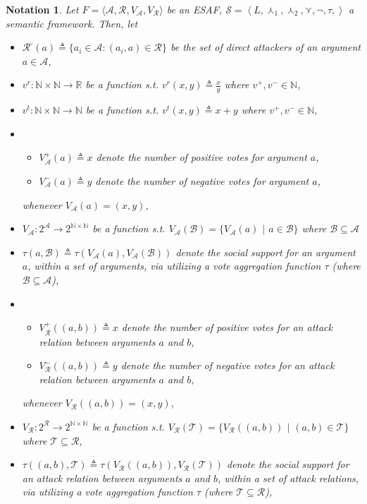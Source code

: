 \documentclass{article}
\newtheorem{notation}{Notation}
\newcommand{\nat}{\mathbb{N}}   %
\newcommand{\real}{\mathbb{R}}  %
\newcommand{\args}{\mathcal{A}} %
\newcommand{\att}{\mathcal{R}}  %
\newcommand{\valueset}{L}
\newcommand{\varg}{V_{\args}}   %
\newcommand{\vargpro}[1]{\varg^+\left(#1\right)} %
\newcommand{\vargcon}[1]{\varg^-\left(#1\right)} %
\newcommand{\vatt}{V_{\att}}   %
\newcommand{\vattpro}[1]{\vatt^+\left(#1\right)} %
\newcommand{\vattcon}[1]{\vatt^-\left(#1\right)} %
\newcommand{\attackers}[1]{\att^\text{-}\left(#1\right)}
\newcommand{\safid}{F}               %
\newcommand{\saf}{\safid = \safbody} %
\newcommand{\safbody}{\langle \args, \att, \varg, \vatt \rangle} %
\newcommand{\sembodyNew}{\left\langle \valueset,\SAFand_1, \SAFand_2,\SAFor,\lnot,\tau, \right\rangle} %
\newcommand{\SAFand}{\curlywedge}     %
\newcommand{\SAFor}{\curlyvee}        %
\newcommand{\sem}{\mathcal{S}}
\begin{document}
\begin{notation}
Let $\saf$ be an ESAF, $\sem = \sembodyNew$ a semantic framework. Then, let
\begin{itemize}
\item $\attackers{a} \triangleq \{a_i \in \args: (a_i, a) \in \att\}$ be the set of direct attackers of an argument $a \in \args$, 
\item $v^r: \nat \times \nat \to \real$ be a function s.t. $v^r(x, y) \triangleq \frac{x}{y}$ where $v^{+}, v^{-} \in \mathbb{N}$,
\item $v^t: \nat \times \nat \to \nat$ be a function s.t. $v^t(x, y) \triangleq x + y$ where $v^{+}, v^{-} \in \mathbb{N}$, 
\item 
\begin{itemize}
\item $\vargpro a \triangleq x$ denote the number of positive votes for argument $a$,
\item $\vargcon a \triangleq y$ denote the number of negative votes for argument $a$,
\end{itemize}
whenever $\varg (a) = (x, y)$,
\\
\item $\varg: 2^\args \to 2^{\nat \times \nat}$ be a function s.t. $\varg(\mathcal{B}) = \{\varg(a)$ $|$ $a \in \mathcal{B}\}$ where $\mathcal{B} \subseteq \args$
\item $\tau(a, \mathcal{B}) \triangleq \tau(V_{\mathcal{A}}(a), \varg(\mathcal{B}))$ denote the social support for an argument $a$, within a set of arguments, via utilizing a vote aggregation function $\tau$ (where $\mathcal{B} \subseteq \args$),
\item
\begin{itemize}
\item $\vattpro{(a, b)} \triangleq x$ denote the number of positive votes for an attack relation between arguments  $a$ and $b$,
\item  $ \vattcon{(a, b)} \triangleq y$ denote the number of negative votes for an attack relation between arguments  $a$ and $b$,
\end{itemize}
whenever $\vatt ((a, b)) = (x, y)$,
\\
\item $\vatt: 2^\att \to 2^{\nat \times \nat}$ be a function s.t. $\vatt(\mathcal{T}) = \{\vatt((a, b))$ $|$ $(a, b) \in \mathcal{T}\}$ where $\mathcal{T} \subseteq \att$,
\item $\tau((a, b), \mathcal{T}) \triangleq \tau(V_{\mathcal{R}}((a, b)), \vatt(\mathcal{T}))$ denote the social support for an attack relation between arguments  $a$ and $b$, within a set of attack relations, via utilizing a vote aggregation function $\tau$ (where $\mathcal{T} \subseteq \att$),

\end{itemize}
\end{notation}
\end{document}
